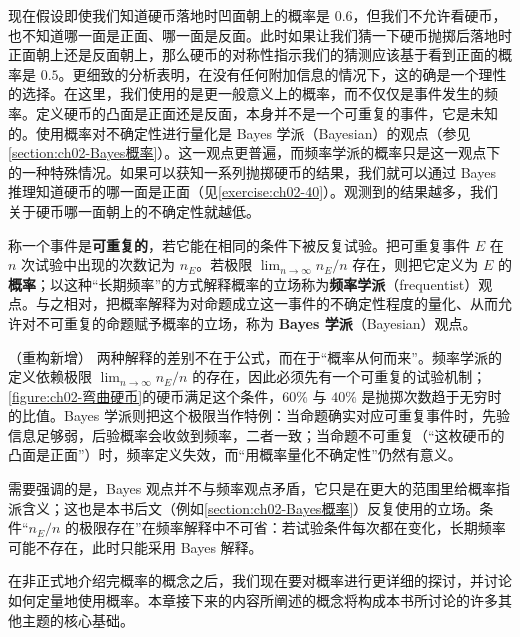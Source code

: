 \documentclass[../main.tex]{subfiles}
\begin{document}
现在假设即使我们知道硬币落地时凹面朝上的概率是 $0.6$，但我们不允许看硬币，也不知道哪一面是正面、哪一面是反面。此时如果让我们猜一下硬币抛掷后落地时正面朝上还是反面朝上，那么硬币的对称性指示我们的猜测应该基于看到正面的概率是 $0.5$。更细致的分析表明，在没有任何附加信息的情况下，这的确是一个理性的选择。在这里，我们使用的是更一般意义上的概率，而不仅仅是事件发生的频率。定义硬币的凸面是正面还是反面，本身并不是一个可重复的事件，它是未知的。使用概率对不确定性进行量化是 Bayes 学派（Bayesian）的观点（参见\cref{section:ch02-Bayes概率}）。这一观点更普遍，而频率学派的概率只是这一观点下的一种特殊情况。如果可以获知一系列抛掷硬币的结果，我们就可以通过 Bayes 推理知道硬币的哪一面是正面（见\cref{exercise:ch02-40}）。观测到的结果越多，我们关于硬币哪一面朝上的不确定性就越低。

\begin{definition}\label{definition:ch02-概率的两种解释}
称一个事件是\textbf{可重复的}，若它能在相同的条件下被反复试验。把可重复事件 $E$ 在 $n$ 次试验中出现的次数记为 $n_E$。若极限 $\lim_{n\to\infty} n_E/n$ 存在，则把它定义为 $E$ 的\textbf{概率}；以这种“长期频率”的方式解释概率的立场称为\textbf{频率学派}（frequentist）观点。与之相对，把概率解释为对命题成立这一事件的不确定性程度的量化、从而允许对不可重复的命题赋予概率的立场，称为 \textbf{Bayes 学派}（Bayesian）观点。
\end{definition}

\begin{remark}（重构新增）
两种解释的差别不在于公式，而在于“概率从何而来”。频率学派的定义依赖极限 $\lim_{n\to\infty}n_E/n$ 的存在，因此必须先有一个可重复的试验机制；\cref{figure:ch02-弯曲硬币}的硬币满足这个条件，$60\%$ 与 $40\%$ 是抛掷次数趋于无穷时的比值。Bayes 学派则把这个极限当作特例：当命题确实对应可重复事件时，先验信息足够弱，后验概率会收敛到频率，二者一致；当命题不可重复（“这枚硬币的凸面是正面”）时，频率定义失效，而“用概率量化不确定性”仍然有意义。

需要强调的是，Bayes 观点并不与频率观点矛盾，它只是在更大的范围里给概率指派含义；这也是本书后文（例如\cref{section:ch02-Bayes概率}）反复使用的立场。条件“$n_E/n$ 的极限存在”在频率解释中不可省：若试验条件每次都在变化，长期频率可能不存在，此时只能采用 Bayes 解释。
\end{remark}

在非正式地介绍完概率的概念之后，我们现在要对概率进行更详细的探讨，并讨论如何定量地使用概率。本章接下来的内容所阐述的概念将构成本书所讨论的许多其他主题的核心基础。








\end{document}
